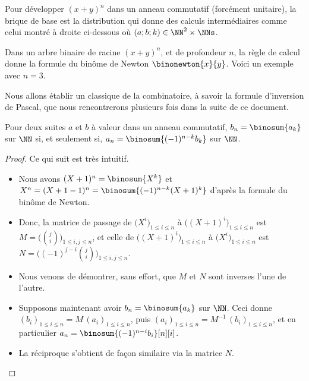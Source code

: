 Pour développer $(x + y)^n$ dans un anneau commutatif (forcément unitaire), la brique de base est la distribution qui donne des calculs intermédiaires comme celui montré à droite ci-dessous où $(a;b;k) \in \NN^2 \times \NNs$.

%
            {\intertree}{}

Dans un arbre binaire de racine $(x + y)^n$, et de profondeur $n$, la règle de calcul donne la formule du binôme de Newton
$\binonewton{x}{y}$.
%
Voici un exemple avec $n=3$.





Nous allons établir un classique de la combinatoire, à savoir la formule d'inversion de Pascal, que nous rencontrerons plusieurs fois dans la suite de ce document.


\begin{fact} \label{pascal-inv}
	Pour deux suites $a$ et $b$ à valeur dans un anneau commutatif,
	$b_n = \binosum{a_k}$ sur $\NN$
	si, et seulement si,
	$a_n = \binosum{(-1)^{n-k} b_k}$ sur $\NN$.
\end{fact}


\begin{proof}
	Ce qui suit est très intuitif.
	\begin{itemize}
		\item Nous avons
		$(X + 1)^n = \binosum{X^k}$
		et
		$X^n = (X + 1 - 1)^n = \binosum{(-1)^{n-k} (X+1)^k}$
		d'après la formule du binôme de Newton.
		

		\item Donc, la matrice de passage de
		$\big( X^i \big)_{1 \leq i \leq n}$
		à
		$\big( (X + 1)^i \big)_{1 \leq i \leq n}$
		est
		$M = \big( \binom{j}{i} \big)_{1 \leq i, j \leq n}$,
		et celle de
		$\big( (X + 1)^i \big)_{1 \leq i \leq n}$
		à
		$\big( X^i \big)_{1 \leq i \leq n}$
		est
		$N = \big( (-1)^{j-i} \binom{j}{i} \big)_{1 \leq i, j \leq n}$.
		

		\item Nous venons de démontrer, sans effort, que $M$ et $N$ sont inverses l'une de l'autre.
		

		\item Supposons maintenant avoir $b_n = \binosum{a_k}$  sur $\NN$.
		Ceci donne
		$(b_i)_{1 \leq i \leq n} = M \, (a_i)_{1 \leq i \leq n}$,
		puis
		$(a_i)_{1 \leq i \leq n} = M^{-1} \, (b_i)_{1 \leq i \leq n}$,
		et en particulier
		$a_n = \binosum{(-1)^{n-i} b_i}[n][i]$.
		

		\item La réciproque s'obtient de façon similaire via la matrice $N$.
	\end{itemize}

	\null\vspace{-6ex}
\end{proof}


